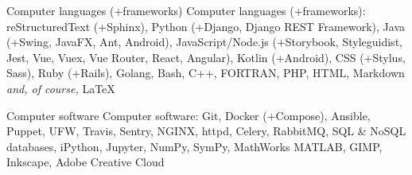 
\resumeonesubsection
{Computer languages (+frameworks)}
{Computer languages (+frameworks):}
\sectiondescription
{
reStructuredText (+Sphinx),
Python (+Django, Django REST Framework),
Java (+Swing, JavaFX, Ant, Android),
JavaScript/Node.js (+Storybook, Styleguidist, Jest, Vue, Vuex, Vue Router, React, Angular),
Kotlin (+Android),
CSS (+Stylus, Sass),
Ruby (+Rails), Golang,
Bash, C++, FORTRAN,
PHP, HTML, Markdown
\textit{and, of course,} {\selectfont\LaTeX}
}

\resumeonesubsection
{Computer software}
{Computer software:}
\sectiondescription
{
Git,
Docker (+Compose),
Ansible, Puppet, UFW,
Travis, Sentry,
NGINX, httpd, Celery, RabbitMQ, SQL \& NoSQL databases,
iPython, Jupyter, NumPy, SymPy, MathWorks MATLAB,
GIMP, Inkscape, Adobe Creative Cloud
}
